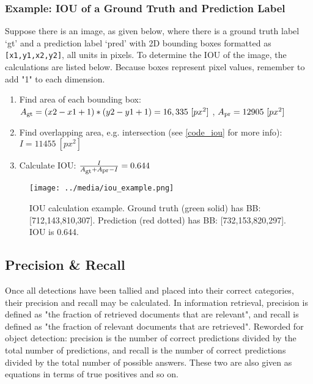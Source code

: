 \subsubsection{Example: IOU of a Ground Truth and Prediction Label}
Suppose there is an image, as given below, where there is a ground truth label `gt' and a prediction label `pred' with 2D bounding boxes formatted as \texttt{[x1,y1,x2,y2]}, all units in pixels. To determine the IOU of the image, the calculations are listed below. Because boxes represent pixel values, remember to add "1" to each dimension.

\def \pxpx {\ [px^2]}
\def \Asub #1{A\textsubscript{#1}}
\begin{enumerate}\itemsep=-0.5em
    \item Find area of each bounding box: \\ $\Asub{gt} = (x2-x1+1)*(y2-y1+1) = 16,335 \pxpx $ , $ \Asub{pr} = 12905 \pxpx $
    \item Find overlapping area, e.g. intersection (see \ref{code_iou} for more info): $I = 11455 \pxpx $
    \item Calculate IOU: $\frac{I}{\Asub{gt} + \Asub{pr} - I} = 0.644 $
\end{enumerate}

\begin{figure}[h] %
    \centering
    \texttt{[image: ../media/iou\_example.png]}
    \caption{IOU calculation example. Ground truth (green solid) has BB: [712,143,810,307]. Prediction (red dotted) has BB: [732,153,820,297]. IOU is 0.644.}
    \label{iou_example} %
\end{figure}


\subsection{Precision \& Recall}
Once all detections have been tallied and placed into their correct categories, their precision and recall may be calculated. In information retrieval, precision is defined as "the fraction of retrieved documents that are relevant", and recall is defined as "the fraction of relevant documents that are retrieved". Reworded for object detection: precision is the number of correct predictions divided by the total number of predictions, and recall is the number of correct predictions divided by the total number of possible answers. These two are also given as equations in terms of true positives and so on. 

